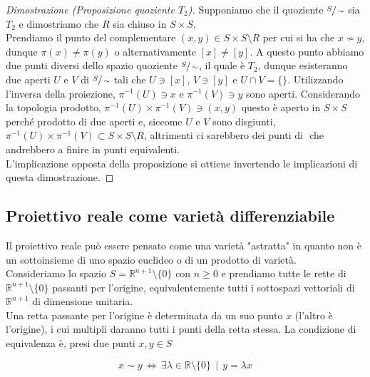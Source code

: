 \begin{proof}[Dimostrazione (Proposizione quoziente $ T_{2} $)]\label{solved-es2-3}
	Supponiamo che il quoziente $ \sfrac{S}{\sim} $ sia $ T_{2} $ e dimostriamo che $ R $ sia chiuso in $ S\times S $.\\
	Prendiamo il punto del complementare $ (x,y) \in S \times S \setminus R $ per cui si ha che $ x \nsim y $, dunque $ \pi(x) \neq \pi(y) $ o alternativamente $ [x] \neq [y] $. A questo punto abbiamo due punti diversi dello spazio quoziente $ \sfrac{S}{\sim} $, il quale è $ T_{2} $, dunque esisteranno due aperti $ U $ e $ V $ di $ \sfrac{S}{\sim} $ tali che $ U \ni [x] $, $ V \ni [y] $ e $ U \cap V = \{\} $. Utilizzando l'inversa della proiezione, $ \pi^{-1}(U) \ni x $ e $ \pi^{-1}(V) \ni y $ sono aperti. Considerando la topologia prodotto, $ \pi^{-1}(U) \times \pi^{-1}(V) \ni (x,y) $ questo è aperto in $ S \times S $ perché prodotto di due aperti e, siccome $ U $ e $ V $ sono disgiunti, $ \pi^{-1}(U) \times \pi^{-1}(V) \subset S \times S \setminus R $, altrimenti ci sarebbero dei punti di $  $ che andrebbero a finire in punti equivalenti.\\
	L'implicazione opposta della proposizione si ottiene invertendo le implicazioni di questa dimostrazione.
\end{proof}

\subsection{Proiettivo reale come varietà differenziabile}

Il proiettivo reale può essere pensato come una varietà "astratta" in quanto non è un sottoinsieme di uno spazio euclideo o di un prodotto di varietà.\\
Consideriamo lo spazio $ S = \mathbb{R}^{n+1} \setminus \{0\} $ con $ n \geqslant 0 $ e prendiamo tutte le rette di $ \mathbb{R}^{n+1} \setminus \{0\} $ passanti per l'origine, equivalentemente tutti i sottospazi vettoriali di $ \mathbb{R}^{n+1} $ di dimensione unitaria.\\
Una retta passante per l'origine è determinata da un suo punto $ x $ (l'altro è l'origine), i cui multipli daranno tutti i punti della retta stessa. La condizione di equivalenza è, presi due punti $ x,y \in S $

\begin{equation}
	x \sim y \, \iff \, \exists \lambda \in \mathbb{R} \setminus \{0\} \, \mid \, y = \lambda x
\end{equation}

